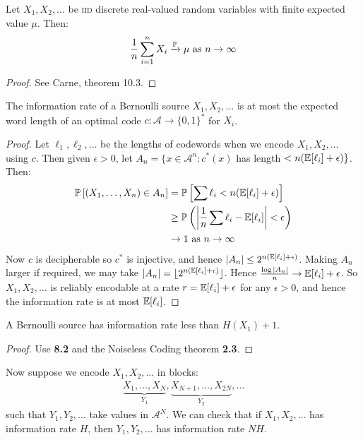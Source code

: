 \documentclass[10pt,a4paper]{article}
\begin{document}
\begin{theorem}
Let $X_1, X_2, \ldots$ be \textsc{iid} discrete real-valued random variables with finite expected value $\mu$. Then:
\begin{align*}
\frac1n \sum_{i=1}^n X_i \xrightarrow{\P} \mu\text{ as } n\to \infty
\end{align*}
\end{theorem}
\begin{proof}
See Carne, theorem 10.3.
\end{proof}
\begin{lemma}
The information rate of a Bernoulli source $X_1, X_2, \ldots$ is at most the expected word length of an optimal code $c:\mathscr{A} \to \{0,1\}^{\ast}$ for $X_i$.
\end{lemma}
\begin{proof}
Let $\ell_1, \ell_2, \ldots$ be the lengths of codewords when we encode $X_1, X_2, \ldots$ using $c$. Then given $\epsilon >0$, let $A_n = \{x \in \mathscr{A}^n : c^{\ast}(x)$ has length $< n(\E[\ell_i] + \epsilon)\}$. Then:
\begin{align*}
\P\left[(X_1, \ldots, X_n) \in A_n\right] &= \P\left[\sum \ell_i < n(\E[\ell_i] +\epsilon)\right]\\
&\geq \P\left(\left|\frac1n \sum\ell_i - \E[\ell_i]\right| < \epsilon\right)\\
&\to 1 \text{ as } n \to \infty
\end{align*}
Now $c$ is decipherable so $c^{\ast}$ is injective, and hence $|A_n| \leq 2^{n(\E[\ell_i]+\epsilon)}$. Making $A_n$ larger if required, we may take $|A_n| =\floor{2^{n(\E[\ell_i]+\epsilon)}}$. Hence $\frac{\log|A_n|}{n} \to \E[\ell_i] + \epsilon$. So $X_1, X_2, \ldots$ is reliably encodable at a rate $r = \E[\ell_i] +\epsilon$ for any $\epsilon > 0$, and hence the information rate is at most $\E[\ell_i]$.
\end{proof}
\begin{corollary}
A Bernoulli source has information rate less than $H(X_1) + 1$.
\end{corollary}
\begin{proof}
Use \textbf{8.2} and the Noiseless Coding theorem \textbf{2.3}.
\end{proof}

Now suppose we encode $X_1, X_2, \ldots$ in blocks:
\begin{align*}
\underbrace{X_1, \ldots, X_N}_{Y_1}, \underbrace{X_{N+1}, \ldots, X_{2N}}_{Y_2}, \ldots
\end{align*}
such that $Y_1, Y_2, \ldots$ take values in $\mathscr{A}^N$. We can check that if $X_1,  X_2, \ldots$ has information rate $H$, then $Y_1, Y_2, \ldots$ has information rate $NH$.
\end{document}
